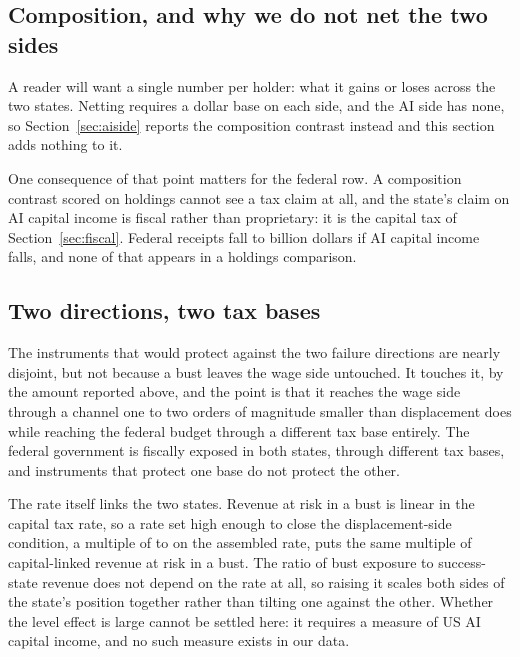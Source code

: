 \subsection{Composition, and why we do not net the two sides}

A reader will want a single number per holder: what it gains or loses across the two states.
Netting requires a dollar base on each side, and the AI side has none, so
Section~\ref{sec:aiside} reports the composition contrast instead and this section adds nothing to
it.

One consequence of that point matters for the federal row. A
composition contrast scored on holdings cannot see a tax claim at all, and the state's claim on AI
capital income is fiscal rather than proprietary: it is the capital tax of
Section~\ref{sec:fiscal}. Federal receipts fall  to
 billion dollars if AI capital income falls, and none of that appears in
a holdings comparison.

\subsection{Two directions, two tax bases}

The instruments that would protect against the two failure directions are nearly disjoint, but not
because a bust leaves the wage side untouched. It touches it, by the amount reported above, and
the point is that it reaches the wage side through a channel one to two orders of magnitude
smaller than displacement does while reaching the federal budget through a different tax base
entirely. The federal government is fiscally exposed in both states, through different tax bases,
and instruments that protect one base do not protect the other.

The rate itself links the two states. Revenue at risk in a bust is linear in the capital tax rate,
so a rate set high enough to close the displacement-side condition, a multiple of
 to  on the assembled rate, puts the same
multiple of capital-linked revenue at risk in a bust. The ratio of bust exposure to success-state
revenue does not depend on the rate at all, so raising it scales both sides of the state's
position together rather than tilting one against the other. Whether the level effect is large
cannot be settled here: it requires a measure of US AI capital income, and no such measure exists
in our data.
